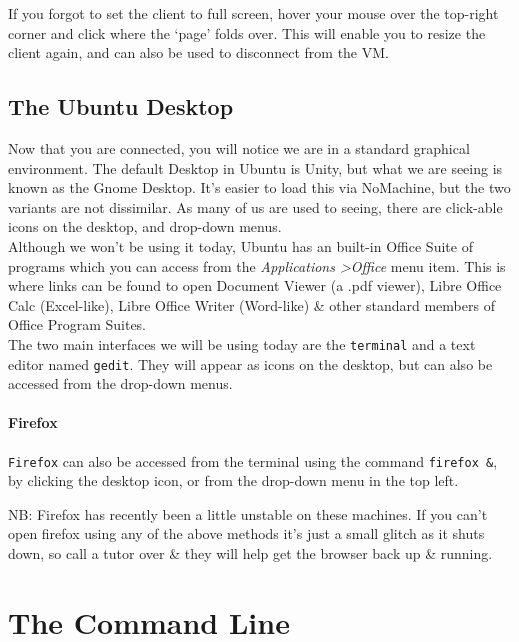 \documentclass[a4paper,12pt,twoside]{memoir}
\begin{document}
If you forgot to set the client to full screen, hover your mouse over the top-right corner and click where the `page' folds over. 
This will enable you to resize the client again, and can also be used to disconnect from the VM.\\


\section{The Ubuntu Desktop}
\begin{note}
Now that you are connected, you will notice we are in a standard graphical environment.
The default Desktop in Ubuntu is Unity, but what we are seeing is known as the Gnome Desktop.
It's easier to load this via NoMachine, but the two variants are not dissimilar.
As many of us are used to seeing, there are click-able icons on the desktop, and drop-down menus. \\

Although we won't be using it today, Ubuntu has an built-in Office Suite of
programs which you can access from the \textit{Applications \textgreater Office} menu item.
This is where links can be found to open Document Viewer (a .pdf viewer), Libre Office Calc (Excel-like), Libre Office Writer (Word-like) \& other standard members of Office Program Suites. \\

The two main interfaces we will be using today are the \texttt{terminal} and a text editor named \texttt{gedit}.
They will appear as icons on the desktop, but can also be accessed from the drop-down menus.
\end{note}

\subsubsection*{Firefox}

\texttt{Firefox} can also be accessed from the terminal using the command \texttt{firefox \&},  by clicking the desktop icon, or from the drop-down menu in the top left.
\begin{warning}
NB: Firefox has recently been a little unstable on these machines.
If you can't open firefox using any of the above methods it's just a small glitch as it shuts down, so call a tutor over \& they will help get the browser back up \& running.
\end{warning}

\clearpage
\chapter{The Command Line}
\end{document}
